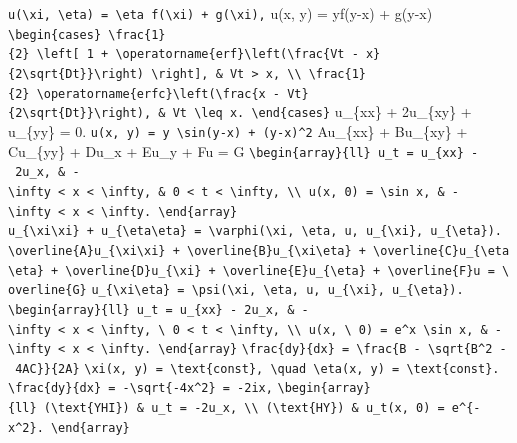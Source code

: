 \documentclass[
  ukrainian,
]{article}
\begin{document}
\texttt{u(\textbackslash{}xi,\ \textbackslash{}eta)\ =\ \textbackslash{}eta\ f(\textbackslash{}xi)\ +\ g(\textbackslash{}xi),}
u(x, y) = yf(y-x) + g(y-x)
\texttt{\textbackslash{}begin\{cases\}\ \textbackslash{}frac\{1\}\{2\}\ \textbackslash{}left{[}\ 1\ +\ \textbackslash{}operatorname\{erf\}\textbackslash{}left(\textbackslash{}frac\{Vt\ -\ x\}\{2\textbackslash{}sqrt\{Dt\}\}\textbackslash{}right)\ \textbackslash{}right{]},\ \&\ Vt\ \textgreater{}\ x,\ \textbackslash{}\textbackslash{}\ \textbackslash{}frac\{1\}\{2\}\ \textbackslash{}operatorname\{erfc\}\textbackslash{}left(\textbackslash{}frac\{x\ -\ Vt\}\{2\textbackslash{}sqrt\{Dt\}\}\textbackslash{}right),\ \&\ Vt\ \textbackslash{}leq\ x.\ \textbackslash{}end\{cases\}}
u\_\{xx\} + 2u\_\{xy\} + u\_\{yy\} = 0.
\texttt{u(x,\ y)\ =\ y\ \textbackslash{}sin(y-x)\ +\ (y-x)\^{}2}
Au\_\{xx\} + Bu\_\{xy\} + Cu\_\{yy\} + Du\_x + Eu\_y + Fu = G
\texttt{\textbackslash{}begin\{array\}\{ll\}\ u\_t\ =\ u\_\{xx\}\ -\ 2u\_x,\ \&\ -\textbackslash{}infty\ \textless{}\ x\ \textless{}\ \textbackslash{}infty,\ \&\ 0\ \textless{}\ t\ \textless{}\ \textbackslash{}infty,\ \textbackslash{}\textbackslash{}\ u(x,\ 0)\ =\ \textbackslash{}sin\ x,\ \&\ -\textbackslash{}infty\ \textless{}\ x\ \textless{}\ \textbackslash{}infty.\ \textbackslash{}end\{array\}}
\texttt{u\_\{\textbackslash{}xi\textbackslash{}xi\}\ +\ u\_\{\textbackslash{}eta\textbackslash{}eta\}\ =\ \textbackslash{}varphi(\textbackslash{}xi,\ \textbackslash{}eta,\ u,\ u\_\{\textbackslash{}xi\},\ u\_\{\textbackslash{}eta\}).}
\texttt{\textbackslash{}overline\{A\}u\_\{\textbackslash{}xi\textbackslash{}xi\}\ +\ \textbackslash{}overline\{B\}u\_\{\textbackslash{}xi\textbackslash{}eta\}\ +\ \textbackslash{}overline\{C\}u\_\{\textbackslash{}eta\textbackslash{}eta\}\ +\ \textbackslash{}overline\{D\}u\_\{\textbackslash{}xi\}\ +\ \textbackslash{}overline\{E\}u\_\{\textbackslash{}eta\}\ +\ \textbackslash{}overline\{F\}u\ =\ \textbackslash{}overline\{G\}}
\texttt{u\_\{\textbackslash{}xi\textbackslash{}eta\}\ =\ \textbackslash{}psi(\textbackslash{}xi,\ \textbackslash{}eta,\ u,\ u\_\{\textbackslash{}xi\},\ u\_\{\textbackslash{}eta\}).}
\texttt{\textbackslash{}begin\{array\}\{ll\}\ u\_t\ =\ u\_\{xx\}\ -\ 2u\_x,\ \&\ -\textbackslash{}infty\ \textless{}\ x\ \textless{}\ \textbackslash{}infty,\ \textbackslash{}\ 0\ \textless{}\ t\ \textless{}\ \textbackslash{}infty,\ \textbackslash{}\textbackslash{}\ u(x,\ \textbackslash{}\ 0)\ =\ e\^{}x\ \textbackslash{}sin\ x,\ \&\ -\textbackslash{}infty\ \textless{}\ x\ \textless{}\ \textbackslash{}infty.\ \textbackslash{}end\{array\}}
\texttt{\textbackslash{}frac\{dy\}\{dx\}\ =\ \textbackslash{}frac\{B\ -\ \textbackslash{}sqrt\{B\^{}2\ -\ 4AC\}\}\{2A\}}
\texttt{\textbackslash{}xi(x,\ y)\ =\ \textbackslash{}text\{const\},\ \textbackslash{}quad\ \textbackslash{}eta(x,\ y)\ =\ \textbackslash{}text\{const\}.}
\texttt{\textbackslash{}frac\{dy\}\{dx\}\ =\ -\textbackslash{}sqrt\{-4x\^{}2\}\ =\ -2ix,}
\texttt{\textbackslash{}begin\{array\}\{ll\}\ (\textbackslash{}text\{YHI\})\ \&\ u\_t\ =\ -2u\_x,\ \textbackslash{}\textbackslash{}\ (\textbackslash{}text\{HY\})\ \&\ u\_t(x,\ 0)\ =\ e\^{}\{-x\^{}2\}.\ \textbackslash{}end\{array\}}
\end{document}

